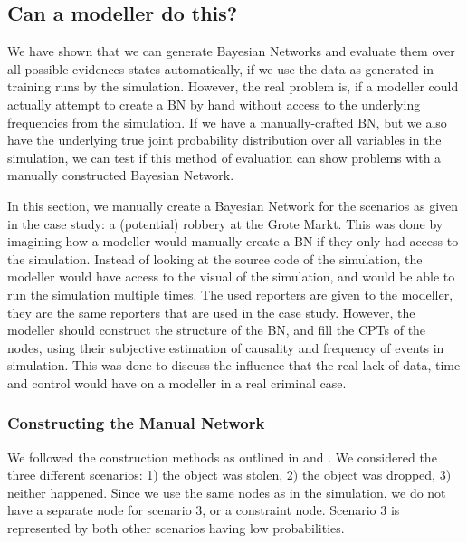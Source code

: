 \documentclass[12pt]{article}
\begin{document}
\subsection{Can a modeller do this?}
We have shown that we can generate Bayesian Networks and evaluate them over all possible evidences states automatically, if we use the data as generated in training runs by the simulation. However, the real problem is, if a modeller could actually attempt to create a BN by hand without access to the underlying frequencies from the simulation. If we have a manually-crafted BN, but we also have the underlying true joint probability distribution over all variables in the simulation, we can test if this method of evaluation can show problems with a manually constructed Bayesian Network. 

In this section, we manually create a Bayesian Network for the scenarios as given in the case study: a (potential) robbery at the Grote Markt. This was done by imagining how a modeller would manually create a BN if they only had access to the simulation. Instead of looking at the source code of the simulation, the modeller would have access to the visual of the simulation, and would be able to run the simulation multiple times. The used reporters are given to the modeller, they are the same reporters that are used in the case study. However, the modeller should construct the structure of the BN, and fill the CPTs of the nodes, using their subjective estimation of causality and frequency of events in simulation. This was done to discuss the influence that the real lack of data, time and control would have on a modeller in a real criminal case.  





\subsubsection{Constructing the Manual Network}

We followed the construction methods as outlined in \citep{vlek2016} and \citep{vanLeeuwen2019}. We considered the three different scenarios: 1) the object was stolen, 2) the object was dropped, 3) neither happened. Since we use the same nodes as in the simulation, we do not have a separate node for scenario 3, or a constraint node. Scenario 3 is represented by both other scenarios having low probabilities.
 
\end{document}
